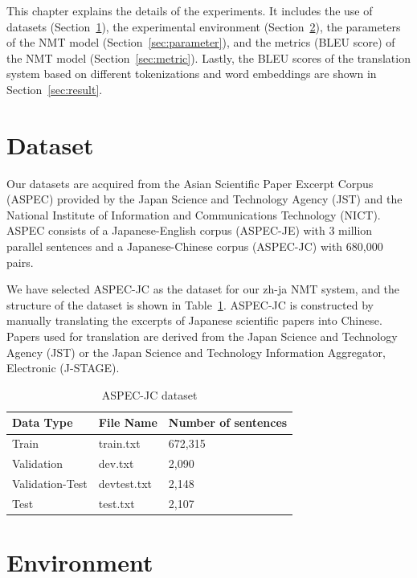 \hspace{24pt}

This chapter explains the details of the experiments. It includes the use of datasets (Section~\ref{sec:dataset}), the experimental environment (Section~\ref{sec:environment}), the parameters of the NMT model (Section~\ref{sec:parameter}), and the metrics (BLEU score) of the NMT model (Section~\ref{sec:metric}). Lastly, the BLEU scores of the translation system based on different tokenizations and word embeddings are shown in Section~\ref{sec:result}.

\section{Dataset} \label{sec:dataset}

Our datasets are acquired from the Asian Scientific Paper Excerpt Corpus (ASPEC) \cite{nakazawa-etal-2016-aspec} provided by the Japan Science and Technology Agency (JST) and the National Institute of Information and Communications Technology (NICT). ASPEC consists of a Japanese-English corpus (ASPEC-JE) with 3 million parallel sentences and a Japanese-Chinese corpus (ASPEC-JC) with 680,000 pairs.

We have selected ASPEC-JC as the dataset for our zh-ja NMT system, and the structure of the dataset is shown in Table~\ref{tab:aspec-jc}. ASPEC-JC is constructed by manually translating the excerpts of Japanese scientific papers into Chinese. Papers used for translation are derived from the Japan Science and Technology Agency (JST) or the Japan Science and Technology Information Aggregator, Electronic (​J-STAGE).

\vspace{0.4cm}
\begin{table}[h]
    \centering
    \begin{tabularx}{\textwidth}{bbb}\toprule
        Data Type & File Name & Number of sentences \\\midrule
        Train & train.txt & 672,315 \\
        Validation & dev.txt & 2,090 \\
        Validation-Test & devtest.txt & 2,148 \\
        Test & test.txt & 2,107 \\
        \bottomrule
    \end{tabularx}
    \caption{ASPEC-JC dataset}
    \label{tab:aspec-jc}
\end{table}

\section{Environment} \label{sec:environment}

